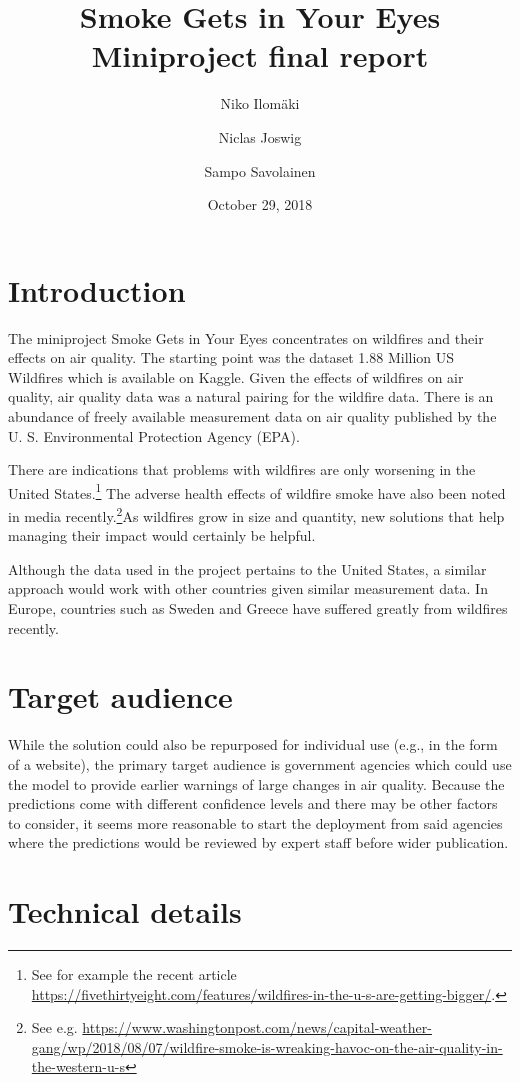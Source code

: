 \documentclass[a4paper,12pt]{article}
\title{Smoke Gets in Your Eyes\\\Large{Miniproject final report}}
\author{Niko Ilomäki \and Niclas Joswig \and Sampo Savolainen}
\date{October 29, 2018}
\begin{document}
\maketitle

\section{Introduction}

The miniproject Smoke Gets in Your Eyes concentrates on wildfires and their effects on air quality. The starting point was the dataset 1.88 Million US Wildfires which is available on Kaggle. Given the effects of wildfires on air quality, air quality data was a natural pairing for the wildfire data. There is an abundance of freely available measurement data on air quality published by the U. S. Environmental Protection Agency (EPA).

There are indications that problems with wildfires are only worsening in the United States.\footnote{See for example the recent article \url{https://fivethirtyeight.com/features/wildfires-in-the-u-s-are-getting-bigger/}.} The adverse health effects of wildfire smoke have also been noted in media recently.\footnote{See e.g. \url{https://www.washingtonpost.com/news/capital-weather-gang/wp/2018/08/07/wildfire-smoke-is-wreaking-havoc-on-the-air-quality-in-the-western-u-s}}As wildfires grow in size and quantity, new solutions that help managing their impact would certainly be helpful.

Although the data used in the project pertains to the United States, a similar approach would work with other countries given similar measurement data. In Europe, countries such as Sweden and Greece have suffered greatly from wildfires recently.

\section{Target audience}

While the solution could also be repurposed for individual use (e.g., in the form of a website), the primary target audience is government agencies which could use the model to provide earlier warnings of large changes in air quality. Because the predictions come with different confidence levels and there may be other factors to consider, it seems more reasonable to start the deployment from said agencies where the predictions would be reviewed by expert staff before wider publication.

\section{Technical details}
\end{document}
